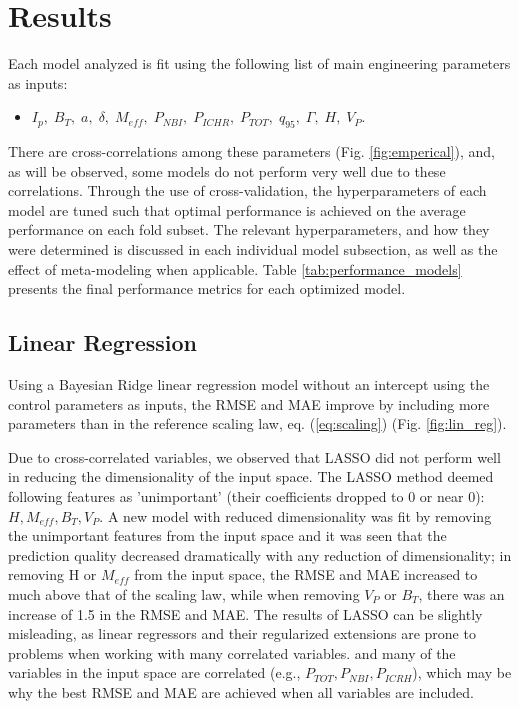 \documentclass[a4paper, twoside, final, 12pt]{article}
\begin{document}
\section{Results}{\label{sec:results_1}
Each model analyzed is fit using the following list of main engineering parameters as inputs:
\begin{itemize}
        \item $I_p, \; B_T,\; a, \; \delta, \; M_{eff},\; P_{NBI},\; P_{ICHR},\; P_{TOT}, \; q_{95},\; \Gamma, \; H,\; V_P$.
\end{itemize}
There are cross-correlations among these parameters (Fig. \ref{fig:emperical}), and, as will be observed, some models do not perform very well due to these correlations. 
Through the use of cross-validation, the hyperparameters of each model are tuned such that optimal performance is achieved on the average performance on each fold subset.
The relevant hyperparameters, and how they were determined is discussed in each individual model subsection, as well as the effect of meta-modeling when applicable.
Table \ref{tab:performance_models} presents the final performance metrics for each optimized model. 

\subsection{Linear Regression}
Using a Bayesian Ridge linear regression model without an intercept using the control parameters as inputs, the RMSE and MAE improve by including more parameters than in the reference scaling law, eq. (\ref{eq:scaling}) (Fig. \ref{fig:lin_reg}).

Due to cross-correlated variables, we observed that LASSO did not perform well in reducing the dimensionality of the input space. The LASSO method deemed following features as 'unimportant' (their coefficients dropped to 0 or near 0): $H, M_{eff}, B_T, V_P$. A new model with reduced dimensionality was fit by removing the unimportant features from the input space and it was seen that the prediction quality decreased dramatically with any reduction of dimensionality; in removing H or $M_{eff}$ from the input space, the RMSE and MAE increased to much above that of the scaling law, while when removing $V_P$ or $B_T$, there was an increase of 1.5 in the RMSE and MAE. 
The results of LASSO can be slightly misleading, as linear regressors and their regularized extensions are prone to problems when working with many correlated variables. and many of the variables in the input space are correlated (e.g., $P_{TOT}, P_{NBI}, P_{ICRH}$), which may be why the best RMSE and MAE are achieved when all variables are included.

}
\end{document}
